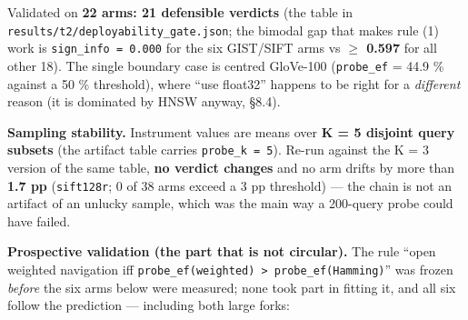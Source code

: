\documentclass[
  10pt,
]{article}
\newcounter{none} %
\begin{document}
Validated on \textbf{22 arms: 21 defensible verdicts} (the table in
\texttt{results/t2/deployability\_gate.json}; the bimodal gap that makes
rule (1) work is \texttt{sign\_info\ =\ 0.000} for the six GIST/SIFT arms
vs \textbf{$\geq$ 0.597} for all other 18). The single boundary case is
centred GloVe-100 (\texttt{probe\_ef} = 44.9 \% against a 50 \%
threshold), where ``use float32'' happens to be right for a
\emph{different} reason (it is dominated by HNSW anyway, §8.4).

\textbf{Sampling stability.} Instrument values are means over \textbf{K
= 5 disjoint query subsets} (the artifact table carries
\texttt{probe\_k\ =\ 5}). Re-run against the K = 3 version of the same
table, \textbf{no verdict changes} and no arm drifts by more than
\textbf{1.7 pp} (\texttt{sift128r}; 0 of 38 arms exceed a 3 pp
threshold) --- the chain is not an artifact of an unlucky sample, which
was the main way a 200-query probe could have failed.

\textbf{Prospective validation (the part that is not circular).} The
rule ``open weighted navigation iff
\texttt{probe\_ef(weighted)\ \textgreater{}\ probe\_ef(Hamming)}'' was
frozen \emph{before} the six arms below were measured; none took part in
fitting it, and all six follow the prediction --- including both large
forks:
\end{document}
